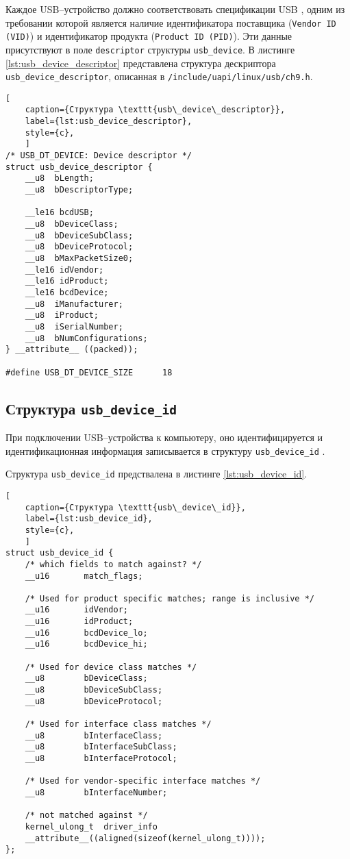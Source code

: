 Каждое USB--устройство должно соответствовать спецификации USB \cite{usb_spec}, одним из требовании которой является наличие идентификатора поставщика (\texttt{Vendor ID (VID)}) и идентификатор продукта (\texttt{Product ID (PID)}). Эти данные присутствуют в поле \texttt{descriptor} структуры \texttt{usb\_device}. В листинге \ref{lst:usb_device_descriptor} представлена структура дескриптора \texttt{usb\_device\_descriptor}, описанная в \texttt{/include/uapi/linux/usb/ch9.h}.

\begin{lstlisting}[
	caption={Структура \texttt{usb\_device\_descriptor}},
	label={lst:usb_device_descriptor},
	style={c},
	]
/* USB_DT_DEVICE: Device descriptor */
struct usb_device_descriptor {
	__u8  bLength;
	__u8  bDescriptorType;
	
	__le16 bcdUSB;
	__u8  bDeviceClass;
	__u8  bDeviceSubClass;
	__u8  bDeviceProtocol;
	__u8  bMaxPacketSize0;
	__le16 idVendor;
	__le16 idProduct;
	__le16 bcdDevice;
	__u8  iManufacturer;
	__u8  iProduct;
	__u8  iSerialNumber;
	__u8  bNumConfigurations;
} __attribute__ ((packed));

#define USB_DT_DEVICE_SIZE		18
\end{lstlisting}

\subsection{Структура \texttt{usb\_device\_id}}

При подключении USB--устройства к компьютеру, оно идентифицируется и идентификационная информация записывается в структуру \texttt{usb\_device\_id} \cite{usb_device_id}.

Структура \texttt{usb\_device\_id} предствалена в листинге \ref{lst:usb_device_id}.

\begin{lstlisting}[
	caption={Структура \texttt{usb\_device\_id}},
	label={lst:usb_device_id},
	style={c},
	]
struct usb_device_id {
	/* which fields to match against? */
	__u16		match_flags;
	
	/* Used for product specific matches; range is inclusive */
	__u16		idVendor;
	__u16		idProduct;
	__u16		bcdDevice_lo;
	__u16		bcdDevice_hi;
	
	/* Used for device class matches */
	__u8		bDeviceClass;
	__u8		bDeviceSubClass;
	__u8		bDeviceProtocol;
	
	/* Used for interface class matches */
	__u8		bInterfaceClass;
	__u8		bInterfaceSubClass;
	__u8		bInterfaceProtocol;
	
	/* Used for vendor-specific interface matches */
	__u8		bInterfaceNumber;
	
	/* not matched against */
	kernel_ulong_t	driver_info
	__attribute__((aligned(sizeof(kernel_ulong_t))));
};
\end{lstlisting}

